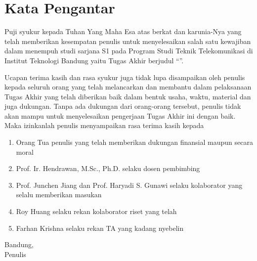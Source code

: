 \chapter*{Kata Pengantar}


Puji syukur kepada Tuhan Yang Maha Esa atas berkat dan karunia-Nya yang telah
memberikan kesempatan penulis untuk menyelesaikan salah satu kewajiban dalam
menempuh studi sarjana S1 pada Program Studi Teknik Telekomunikasi di Institut
Teknologi Bandung yaitu Tugas Akhir berjudul “\textbf{\thetitle}”.

Ucapan terima kasih dan rasa syukur juga tidak lupa disampaikan oleh penulis
kepada seluruh orang yang telah melancarkan dan membantu dalam pelaksanaan
Tugas Akhir yang telah diberikan baik dalam bentuk usaha, waktu, material dan
juga dukungan. Tanpa ada dukungan dari orang-orang tersebut, penulis tidak akan
mampu untuk menyelesaikan pengerjaan Tugas Akhir ini dengan baik. Maka
izinkanlah penulis menyampaikan rasa terima kasih kepada

\begin{enumerate}
    \item Orang Tua penulis yang telah memberikan dukungan finansial maupun secara moral
    \item Prof. Ir. Hendrawan, M.Sc., Ph.D. selaku dosen pembimbing
    \item Prof. Junchen Jiang dan Prof. Haryadi S. Gunawi selaku kolaborator yang selalu memberikan masukan
    \item Roy Huang selaku rekan kolaborator riset yang telah 
    \item Farhan Krishna selaku rekan TA yang kadang nyebelin
\end{enumerate}

Bandung, \thedate \\[\baselineskip]
Penulis